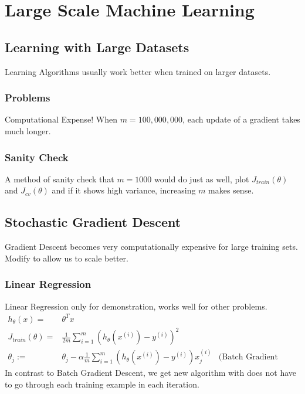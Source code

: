 \chapter{Large Scale Machine Learning}
\section{Learning with Large Datasets}
Learning Algorithms usually work better when trained on larger datasets.

\subsection{Problems}
Computational Expense! When $m = 100,000,000$, each update of a gradient
takes much longer.

\subsection{Sanity Check}
A method of sanity check that $m = 1000$ would do just as well,
plot $J_{train}(\theta)$ and $J_{cv}(\theta)$ and if it
shows high variance, increasing $m$ makes sense.

\section{Stochastic Gradient Descent}
Gradient Descent becomes very computationally expensive for large
training sets. Modify to allow us to scale better.

\subsection{Linear Regression}
Linear Regression only for demonstration, works well for other problems.
\begin{align*}
	h_\theta(x) ={}       & \theta^Tx                                       \\
	J_{train}(\theta) ={} & \frac{1}{2m}\sum_{i=1}^m \left(
	h_\theta(x^{(i)}) - y^{(i)}
	\right)^2                                                               \\
	\theta_j :={}         & \theta_j - \alpha\frac{1}{m}\sum_{i=1}^m \left(
	h_\theta(x^{(i)}) - y^{(i)}
	\right)x_j^{(i)}      & \text{(Batch Gradient Descent)}
\end{align*}
In contrast to Batch Gradient Descent, we get new algorithm with
does not have to go through each training example in each iteration.

